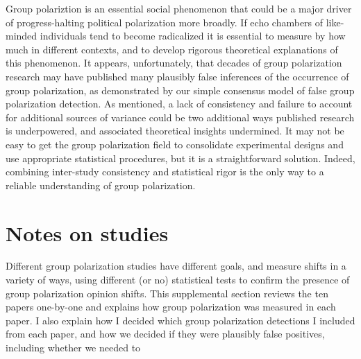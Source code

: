 \documentclass[11pt, letterpaper]{article}
\begin{document}
Group polariztion is an essential social phenomenon that could be a major driver of
progress-halting political polarization more broadly. If echo chambers of like-minded
individuals tend to become radicalized it is essential to measure by how much
in different contexts, and to develop rigorous theoretical explanations of
this phenomenon. It appears, unfortunately, that decades of group polarization
research may have published many plausibly false inferences of the
occurrence of group polarization, as demonstrated by our simple consensus
model of false group polarization detection. As mentioned, a lack of
consistency and failure to account for additional sources of variance could
be two additional ways published research is underpowered, and associated
theoretical insights undermined. It may not be easy to get the group polarization field to 
consolidate experimental designs and use appropriate statistical procedures,
but it is a straightforward solution. Indeed, combining inter-study consistency and statistical
rigor is the only way to a reliable understanding of group polarization.



\setlength{\bibleftmargin}{.125in}
\setlength{\bibindent}{-\bibleftmargin}



\appendix

\section{Notes on studies}

Different group polarization studies have different goals, and measure shifts
in a variety of ways, using different (or no) statistical tests to confirm
the presence of group polarization opinion shifts. This supplemental section
reviews the ten papers one-by-one and explains how group 
polarization was measured in each paper. I also explain how I decided which
group polarization detections I included from each paper, and how we decided
if they were plausibly false positives, including whether we needed to 
\end{document}
